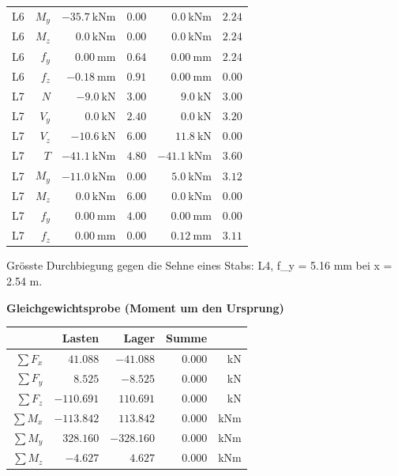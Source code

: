 \documentclass[11pt,a4paper]{article}
\begin{document}
\begin{longtable}{rrrrrr}
L6 & $M_y$ & $-35.7\ \mathrm{kNm}$ & $0.00$ & $0.0\ \mathrm{kNm}$ & $2.24$ \\
L6 & $M_z$ & $0.0\ \mathrm{kNm}$ & $0.00$ & $0.0\ \mathrm{kNm}$ & $2.24$ \\
L6 & $f_y$ & $0.00\ \mathrm{mm}$ & $0.64$ & $0.00\ \mathrm{mm}$ & $2.24$ \\
L6 & $f_z$ & $-0.18\ \mathrm{mm}$ & $0.91$ & $0.00\ \mathrm{mm}$ & $0.00$ \\
L7 & $N$ & $-9.0\ \mathrm{kN}$ & $3.00$ & $9.0\ \mathrm{kN}$ & $3.00$ \\
L7 & $V_y$ & $0.0\ \mathrm{kN}$ & $2.40$ & $0.0\ \mathrm{kN}$ & $3.20$ \\
L7 & $V_z$ & $-10.6\ \mathrm{kN}$ & $6.00$ & $11.8\ \mathrm{kN}$ & $0.00$ \\
L7 & $T$ & $-41.1\ \mathrm{kNm}$ & $4.80$ & $-41.1\ \mathrm{kNm}$ & $3.60$ \\
L7 & $M_y$ & $-11.0\ \mathrm{kNm}$ & $0.00$ & $5.0\ \mathrm{kNm}$ & $3.12$ \\
L7 & $M_z$ & $0.0\ \mathrm{kNm}$ & $6.00$ & $0.0\ \mathrm{kNm}$ & $0.00$ \\
L7 & $f_y$ & $0.00\ \mathrm{mm}$ & $4.00$ & $0.00\ \mathrm{mm}$ & $0.00$ \\
L7 & $f_z$ & $0.00\ \mathrm{mm}$ & $0.00$ & $0.12\ \mathrm{mm}$ & $3.11$ \\
\hline
\end{longtable}
Grösste Durchbiegung gegen die Sehne eines Stabs: L4, f\_y = 5.16 mm bei x = 2.54 m.

\noindent\textbf{Gleichgewichtsprobe (Moment um den Ursprung)}
\begin{longtable}{rrrrr}
\hline
 & Lasten & Lager & Summe &  \\
\hline
\endhead
$\sum F_x$ & $41.088$ & $-41.088$ & $0.000$ & kN \\
$\sum F_y$ & $8.525$ & $-8.525$ & $0.000$ & kN \\
$\sum F_z$ & $-110.691$ & $110.691$ & $0.000$ & kN \\
$\sum M_x$ & $-113.842$ & $113.842$ & $0.000$ & kNm \\
$\sum M_y$ & $328.160$ & $-328.160$ & $0.000$ & kNm \\
$\sum M_z$ & $-4.627$ & $4.627$ & $0.000$ & kNm \\
\hline
\end{longtable}
\end{document}
